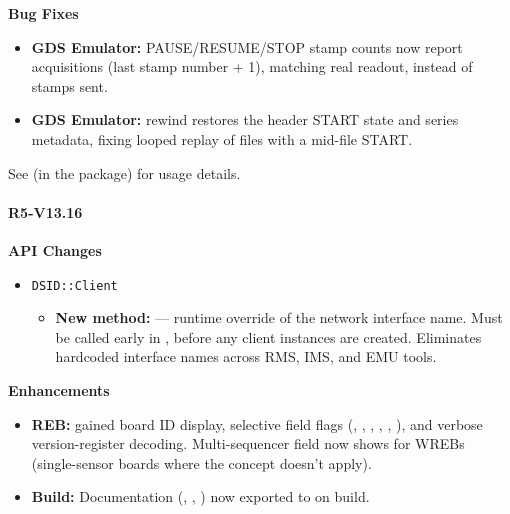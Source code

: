 \noindent\textbf{Bug Fixes}\par\nobreak
\begin{itemize}\compactlist
  \item \textbf{GDS Emulator:} PAUSE/RESUME/STOP stamp counts now report
    acquisitions (last stamp number + 1), matching real readout, instead
    of stamps sent.
  \item \textbf{GDS Emulator:}  rewind restores the header START state
    and series metadata, fixing looped replay of files with a mid-file
    START.
\end{itemize}

See  (in the  package) for usage details.


\paragraph{R5-V13.16}

\noindent\textbf{API Changes}\par\nobreak
\begin{itemize}\compactlist
  \item \texttt{DSID::Client}
  \begin{itemize}\compactlist
    \item \textbf{New method:}  --- runtime override of the network
      interface name. Must be called early in , before any client
      instances are created. Eliminates hardcoded  interface
      names across RMS, IMS, and EMU tools.
  \end{itemize}
\end{itemize}
\noindent\textbf{Enhancements}\par\nobreak
\begin{itemize}\compactlist
  \item \textbf{REB:}  gained board ID display, selective field flags
    (, , , , , ), and
    verbose version-register decoding. Multi-sequencer field now shows
     for WREBs (single-sensor boards where the concept doesn't apply).
  \item \textbf{Build:} Documentation (, ,
    ) now exported to  on build.
\end{itemize}


